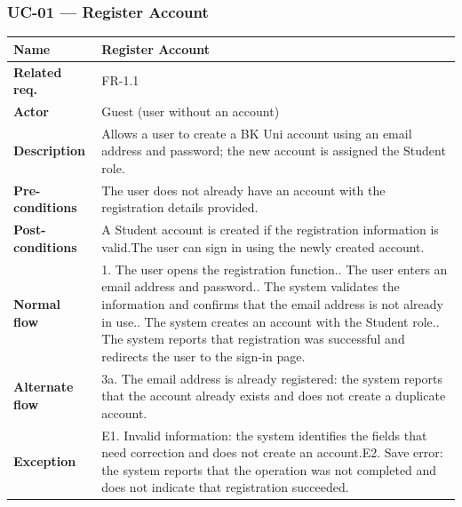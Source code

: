 \subsubsection{UC-01 --- Register Account}
\begin{longtable}{|p{}|p{}|}
\hline
\textbf{Name} & Register Account \\
\hline
\textbf{Related req.} & FR-1.1 \\
\hline
\textbf{Actor} & Guest (user without an account) \\
\hline
\textbf{Description} & Allows a user to create a BK Uni account using an email address and password; the new account is assigned the Student role. \\
\hline
\textbf{Pre-conditions} & The user does not already have an account with the registration details provided. \\
\hline
\textbf{Post-conditions} & A Student account is created if the registration information is valid.\newline The user can sign in using the newly created account. \\
\hline
\textbf{Normal flow} & 1. The user opens the registration function.\newline 2. The user enters an email address and password.\newline 3. The system validates the information and confirms that the email address is not already in use.\newline 4. The system creates an account with the Student role.\newline 5. The system reports that registration was successful and redirects the user to the sign-in page. \\
\hline
\textbf{Alternate flow} & 3a. The email address is already registered: the system reports that the account already exists and does not create a duplicate account. \\
\hline
\textbf{Exception} & E1. Invalid information: the system identifies the fields that need correction and does not create an account.\newline E2. Save error: the system reports that the operation was not completed and does not indicate that registration succeeded. \\
\hline
\end{longtable}

